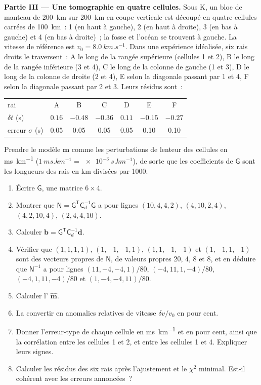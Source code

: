 \begin{problem}
\noindent\textbf{Partie III --- Une tomographie en quatre cellules.} Sous K, un bloc de
manteau de \qty{200}{km} sur \qty{200}{km} en coupe verticale est découpé en quatre
cellules carrées de \qty{100}{km}~: 1 (en haut à gauche), 2 (en haut à droite), 3 (en bas à gauche)
et 4 (en bas à droite)~; la fosse et l'océan se trouvent à gauche. La vitesse de référence est $v_0 = \qty{8.0}{km.s^{-1}}$. Dans une
expérience idéalisée, six rais droits le traversent~: A le long de la rangée supérieure (cellules 1
et 2), B le long de la rangée inférieure (3 et 4), C le long de la colonne de gauche (1 et 3), D
le long de la colonne de droite (2 et 4), E selon la diagonale passant par 1 et 4, F selon
la diagonale passant par 2 et 3. Leurs résidus sont~:
\begin{center}
\small
\begin{tabular}{lcccccc}
\hline
rai & A & B & C & D & E & F \\
$\delta t$ (\unit{s}) & $0.16$ & $-0.48$ & $-0.36$ & $0.11$ & $-0.15$ & $-0.27$ \\
erreur $\sigma$ (\unit{s}) & 0.05 & 0.05 & 0.05 & 0.05 & 0.10 & 0.10 \\
\hline
\end{tabular}
\end{center}
Prendre le modèle $\mathbf m$ comme les perturbations de lenteur des cellules en
\unit{ms.km^{-1}} ($\qty{1}{ms.km^{-1}} = \qty{e-3}{s.km^{-1}}$), de sorte que les
coefficients de $\mathsf G$ sont les longueurs des rais en \unit{km} divisées par 1000.
\begin{enumerate}[resume]
  \item Écrire $\mathsf G$, une matrice $6\times4$.
  \item Montrer que $\mathsf N = \mathsf G^{\mathsf T}\mathsf C_d^{-1}\mathsf G$
        a pour lignes $(10, 4, 4, 2)$, $(4, 10, 2, 4)$, $(4, 2, 10, 4)$,
        $(2, 4, 4, 10)$.
  \item Calculer $\mathbf b = \mathsf G^{\mathsf T}\mathsf C_d^{-1}\mathbf d$.
  \item Vérifier que $(1,1,1,1)$, $(1,-1,-1,1)$, $(1,1,-1,-1)$ et $(1,-1,1,-1)$ sont
        des vecteurs propres de $\mathsf N$, de valeurs propres 20, 4, 8 et 8, et
        en déduire que $\mathsf N^{-1}$ a pour lignes $(11, -4, -4, 1)/80$,
        $(-4, 11, 1, -4)/80$, $(-4, 1, 11, -4)/80$ et $(1, -4, -4, 11)/80$.
  \item Calculer l' $\hat{\mathbf m}$.
  \item La convertir en anomalies relatives de vitesse $\delta v/v_0$ en pour cent.
       \item Donner l'erreur-type de chaque cellule en \unit{ms.km^{-1}} et
        en pour cent, ainsi que la corrélation entre les cellules 1 et 2, et entre les cellules 1
        et 4. Expliquer leurs signes.
  \item Calculer les résidus des six rais après l'ajustement et le
        $\chi^2$ minimal. Est-il cohérent avec les erreurs annoncées~?
\end{enumerate}


\end{problem}
